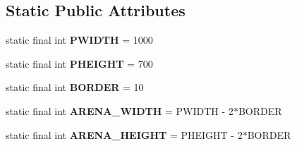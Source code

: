 \subsection*{Static Public Attributes}
\begin{DoxyCompactItemize}
\item 
\hypertarget{classbrick_breaker_1_1_level_editor_ae0ab5f34aa01bae791c845b872c5fd4e}{
static final int {\bfseries PWIDTH} = 1000}
\label{classbrick_breaker_1_1_level_editor_ae0ab5f34aa01bae791c845b872c5fd4e}

\item 
\hypertarget{classbrick_breaker_1_1_level_editor_a790eed4b1962ef59c9be7b7456f5c1d5}{
static final int {\bfseries PHEIGHT} = 700}
\label{classbrick_breaker_1_1_level_editor_a790eed4b1962ef59c9be7b7456f5c1d5}

\item 
\hypertarget{classbrick_breaker_1_1_level_editor_a42f0d0ae33c6156c839f484227f46f8c}{
static final int {\bfseries BORDER} = 10}
\label{classbrick_breaker_1_1_level_editor_a42f0d0ae33c6156c839f484227f46f8c}

\item 
\hypertarget{classbrick_breaker_1_1_level_editor_a61ac04bbe7c6761edd08544444bca215}{
static final int {\bfseries ARENA\_\-WIDTH} = PWIDTH -\/ 2$\ast$BORDER}
\label{classbrick_breaker_1_1_level_editor_a61ac04bbe7c6761edd08544444bca215}

\item 
\hypertarget{classbrick_breaker_1_1_level_editor_ab2764a4a664527baa2bb4af2528da22b}{
static final int {\bfseries ARENA\_\-HEIGHT} = PHEIGHT -\/ 2$\ast$BORDER}
\label{classbrick_breaker_1_1_level_editor_ab2764a4a664527baa2bb4af2528da22b}

\end{DoxyCompactItemize}
